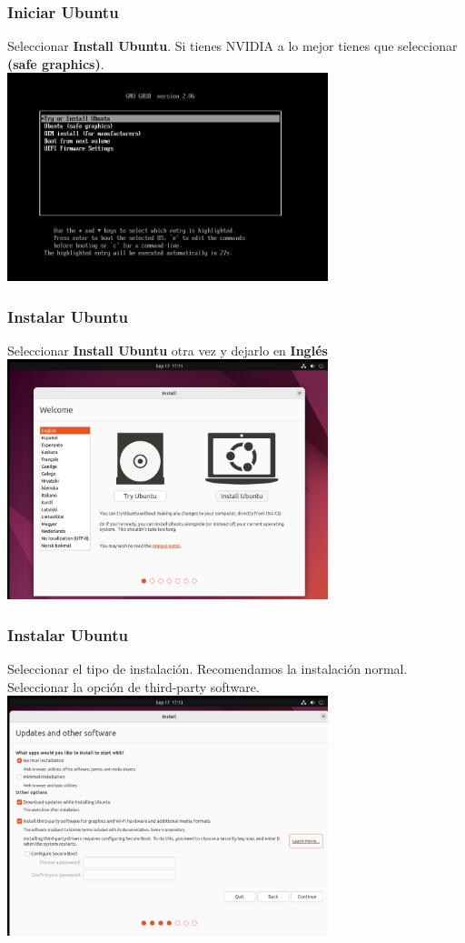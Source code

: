 \documentclass[10pt]{beamer}
\begin{document}
	\begin{frame}
		\frametitle{Iniciar Ubuntu}
		Seleccionar \textbf{Install Ubuntu}. Si tienes NVIDIA a lo mejor tienes que seleccionar \textbf{(safe graphics)}.\\
		
		\includegraphics[width=0.7\textwidth]{install}
	\end{frame}
	
	\begin{frame}
		\frametitle{Instalar Ubuntu}
		Seleccionar \textbf{Install Ubuntu} otra vez y dejarlo en \textbf{Inglés}\\
		
		\includegraphics[width=0.7\textwidth]{install2}
	\end{frame}
	
	\begin{frame}
		\frametitle{Instalar Ubuntu}
		Seleccionar el tipo de instalación. Recomendamos la instalación normal.\\
		Seleccionar la opción de third-party software.\\
		
		
		\includegraphics[width=0.7\textwidth]{installation}
	\end{frame}
	
\end{document}
